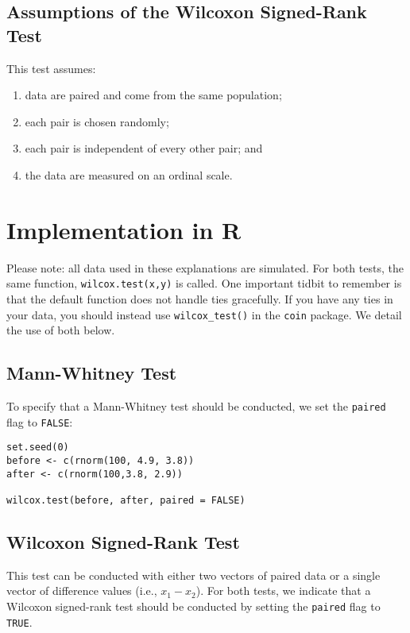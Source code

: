\subsection{Assumptions  of  the Wilcoxon Signed-Rank Test}

This test assumes:
\begin{enumerate}
\item data are paired and come from the same population;
\item each pair is chosen randomly;
\item each pair is independent of every other pair; and
\item the data are measured on an ordinal scale.
\end{enumerate}

\section{Implementation in R}

Please note: all data used in these explanations are simulated. For both tests, the same function, \verb|wilcox.test(x,y)| is called. One important tidbit to remember is that the default function does not handle ties gracefully. If you have any ties in your data, you should instead use \verb|wilcox_test()| in the \verb|coin| package. We detail the use of both below.

\subsection{Mann-Whitney Test}

To specify that a Mann-Whitney test should be conducted, we set the \verb|paired| flag to \verb|FALSE|:

\begin{framed}
\begin{Verbatim}[samepage=TRUE]
set.seed(0)
before <- c(rnorm(100, 4.9, 3.8))
after <- c(rnorm(100,3.8, 2.9))

wilcox.test(before, after, paired = FALSE)
\end{Verbatim}
\end{framed}

\subsection{Wilcoxon Signed-Rank Test}

This test can be conducted with either two vectors of paired data or a single vector of difference values (i.e., $x_1-x_2$). For both tests, we indicate that a Wilcoxon signed-rank test should be conducted by setting the \verb|paired| flag to \verb|TRUE|.

